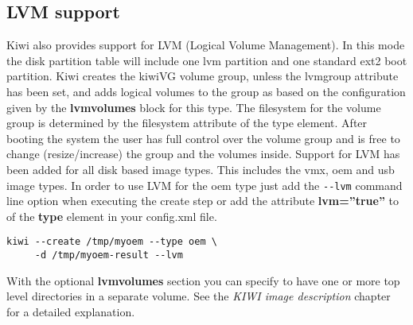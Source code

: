 
\subsection{LVM support}

Kiwi also provides support for LVM (Logical Volume Management). In this
mode the disk partition table will include one lvm partition and one
standard ext2 boot partition. Kiwi creates the kiwiVG volume group, unless
the lvmgroup attribute has been set, and adds logical volumes to the group
as based on the configuration given by the \textbf{lvmvolumes} block
for this type. The filesystem for the volume group is determined by the
filesystem attribute of the type element. After booting the system the user
has full control over the volume group and is free to change
(resize/increase) the group and the volumes inside. Support for LVM has
been added for all disk based image types. This includes the vmx, oem and
usb image types. In order to use LVM for the oem type just add the 
\verb+--lvm+ command line option when executing the create step or add
the attribute \textbf{lvm=''true''} to of the \textbf{type} 
element in your config.xml file.

\begin{Command}{12cm}
\begin{verbatim}
kiwi --create /tmp/myoem --type oem \
     -d /tmp/myoem-result --lvm
\end{verbatim}
\end{Command}

With the optional \textbf{lvmvolumes} section you can specify to have 
one or more top level directories in a separate volume. See the
\textit{KIWI image description} chapter for a detailed explanation.
